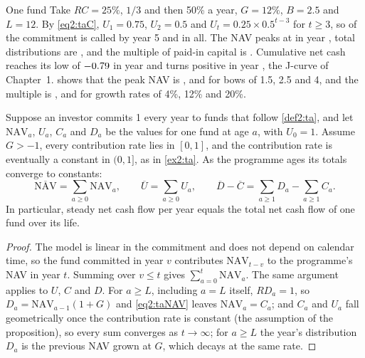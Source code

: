 \begin{chapterrefs}
\begin{example}{One fund}\label{ex2:ta}
Take $RC = 25\%$, $1/3$ and then 50\% a year, $G = 12\%$, $B = 2.5$ and $L = 12$. By \cref{eq2:taC},
$U_1 = 0.75$, $U_2 = 0.5$ and $U_t = 0.25\times 0.5^{t-3}$ for $t\ge 3$, so \taCalledFive{} of the commitment
is called by year 5 and \taCalledTotal{} in all. The NAV peaks at \taPeakNav{} in year \taPeakYear, total
distributions are \taDistTotal, and the multiple of paid-in capital is \taTVPI. Cumulative net cash
reaches its low of $-0.79$ in year \taTroughYear{} and turns positive in year \taBreakeven, the
J-curve of Chapter~1.  shows that the peak NAV is \taPeakBowLow, \taPeakBowMid{} and
\taPeakBowHigh{} for bows of 1.5, 2.5 and 4, and the multiple is \taTVPIGLow, \taTVPIGMid{} and
\taTVPIGHigh{} for growth rates of 4\%, 12\% and 20\%.
\end{example}

\begin{proposition}\label{prop2:steady}
Suppose an investor commits 1 every year to funds that follow \cref{def2:ta}, and let $\mathrm{NAV}_a$,
$U_a$, $C_a$ and $D_a$ be the values for one fund at age $a$, with $U_0 = 1$. Assume $G>-1$, every contribution
rate lies in $[0,1]$, and the contribution rate is eventually a constant in $(0,1]$, as in \cref{ex2:ta}. As the programme ages its totals converge to constants:
\begin{equation}\label{eq2:steady}
  \overline{\mathrm{NAV}} = \sum_{a\ge 0}\mathrm{NAV}_a, \qquad \overline{U} = \sum_{a\ge 0} U_a, \qquad
  \overline{D} - \overline{C} = \sum_{a\ge 1} D_a - \sum_{a\ge 1} C_a .
\end{equation}
In particular, steady net cash flow per year equals the total net cash flow of one fund over its life.
\end{proposition}
\begin{proof}
The model is linear in the commitment and does not depend on calendar time, so the fund committed in
year $v$ contributes $\mathrm{NAV}_{t-v}$ to the programme's NAV in year $t$. Summing over $v \le t$ gives
$\sum_{a=0}^{t}\mathrm{NAV}_a$. The same argument applies to $U$, $C$ and $D$. For $a\ge L$, including $a=L$ itself, $RD_a = 1$, so $D_a = \mathrm{NAV}_{a-1}(1+G)$ and
\cref{eq2:taNAV} leaves $\mathrm{NAV}_a = C_a$; and $C_a$ and $U_a$ fall geometrically once the contribution rate is constant (the assumption of the
proposition),
so every sum converges as $t\to\infty$; for $a \ge L$ the year's distribution $D_a$ is the previous NAV
grown at $G$, which decays at the same rate.
\end{proof}


\end{chapterrefs}
